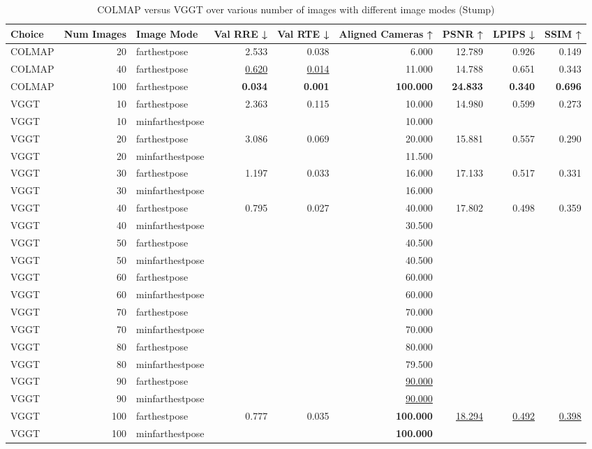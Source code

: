 \begin{table}[H]
\caption{COLMAP versus VGGT over various number of images with different image modes (Stump)}
\label{tab:01_num_images_image_mode_stump}
\centering
\scriptsize
\begin{tabular}{lrlrrrrrr}
\toprule
Choice & Num Images & Image Mode & Val RRE ↓ & Val RTE ↓ & Aligned Cameras ↑ & PSNR ↑ & LPIPS ↓ & SSIM ↑ \\
\midrule
COLMAP & 20 & farthestpose & 2.533 & 0.038 & 6.000 & 12.789 & 0.926 & 0.149 \\
COLMAP & 40 & farthestpose & \underline{0.620} & \underline{0.014} & 11.000 & 14.788 & 0.651 & 0.343 \\
COLMAP & 100 & farthestpose & \textbf{0.034} & \textbf{0.001} & \textbf{100.000} & \textbf{24.833} & \textbf{0.340} & \textbf{0.696} \\
VGGT & 10 & farthestpose & 2.363 & 0.115 & 10.000 & 14.980 & 0.599 & 0.273 \\
VGGT & 10 & minfarthestpose &  &  & 10.000 &  &  &  \\
VGGT & 20 & farthestpose & 3.086 & 0.069 & 20.000 & 15.881 & 0.557 & 0.290 \\
VGGT & 20 & minfarthestpose &  &  & 11.500 &  &  &  \\
VGGT & 30 & farthestpose & 1.197 & 0.033 & 16.000 & 17.133 & 0.517 & 0.331 \\
VGGT & 30 & minfarthestpose &  &  & 16.000 &  &  &  \\
VGGT & 40 & farthestpose & 0.795 & 0.027 & 40.000 & 17.802 & 0.498 & 0.359 \\
VGGT & 40 & minfarthestpose &  &  & 30.500 &  &  &  \\
VGGT & 50 & farthestpose &  &  & 40.500 &  &  &  \\
VGGT & 50 & minfarthestpose &  &  & 40.500 &  &  &  \\
VGGT & 60 & farthestpose &  &  & 60.000 &  &  &  \\
VGGT & 60 & minfarthestpose &  &  & 60.000 &  &  &  \\
VGGT & 70 & farthestpose &  &  & 70.000 &  &  &  \\
VGGT & 70 & minfarthestpose &  &  & 70.000 &  &  &  \\
VGGT & 80 & farthestpose &  &  & 80.000 &  &  &  \\
VGGT & 80 & minfarthestpose &  &  & 79.500 &  &  &  \\
VGGT & 90 & farthestpose &  &  & \underline{90.000} &  &  &  \\
VGGT & 90 & minfarthestpose &  &  & \underline{90.000} &  &  &  \\
VGGT & 100 & farthestpose & 0.777 & 0.035 & \textbf{100.000} & \underline{18.294} & \underline{0.492} & \underline{0.398} \\
VGGT & 100 & minfarthestpose &  &  & \textbf{100.000} &  &  &  \\
\bottomrule
\end{tabular}
\end{table}